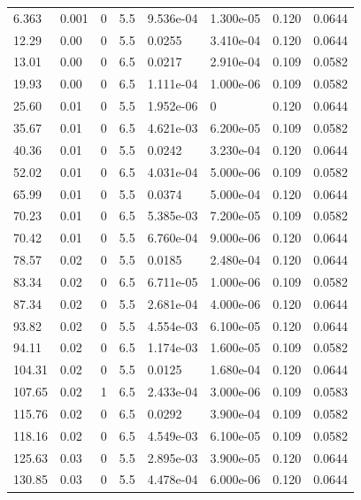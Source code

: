 \documentclass[preview]{standalone}
\begin{document}
{{\begin{tabular}{L{1.2cm}C{1.2cm} C{0.3cm}C{0.5cm} C{1.4cm}C{1.4cm} C{1.4cm}C{1.4cm}}
  6.363  &  0.001  & 0     & 5.5 &  9.536e-04  & 1.300e-05  & 0.120 &  0.0644   \\ 
  12.29  &  0.00  & 0     & 5.5 &  0.0255  & 3.410e-04  & 0.120 &  0.0644   \\ 
  13.01  &  0.00  & 0     & 6.5 &  0.0217  & 2.910e-04  & 0.109 &  0.0582   \\ 
  19.93  &  0.00  & 0     & 6.5 &  1.111e-04  & 1.000e-06  & 0.109 &  0.0582   \\ 
  25.60  &  0.01  & 0     & 5.5 &  1.952e-06  & 0  & 0.120 &  0.0644   \\ 
  35.67  &  0.01  & 0     & 6.5 &  4.621e-03  & 6.200e-05  & 0.109 &  0.0582   \\ 
  40.36  &  0.01  & 0     & 5.5 &  0.0242  & 3.230e-04  & 0.120 &  0.0644   \\ 
  52.02  &  0.01  & 0     & 6.5 &  4.031e-04  & 5.000e-06  & 0.109 &  0.0582   \\ 
  65.99  &  0.01  & 0     & 5.5 &  0.0374  & 5.000e-04  & 0.120 &  0.0644   \\ 
  70.23  &  0.01  & 0     & 6.5 &  5.385e-03  & 7.200e-05  & 0.109 &  0.0582   \\ 
  70.42  &  0.01  & 0     & 5.5 &  6.760e-04  & 9.000e-06  & 0.120 &  0.0644   \\ 
  78.57  &  0.02  & 0     & 5.5 &  0.0185  & 2.480e-04  & 0.120 &  0.0644   \\ 
  83.34  &  0.02  & 0     & 6.5 &  6.711e-05  & 1.000e-06  & 0.109 &  0.0582   \\ 
  87.34  &  0.02  & 0     & 5.5 &  2.681e-04  & 4.000e-06  & 0.120 &  0.0644   \\ 
  93.82  &  0.02  & 0     & 5.5 &  4.554e-03  & 6.100e-05  & 0.120 &  0.0644   \\ 
  94.11  &  0.02  & 0     & 6.5 &  1.174e-03  & 1.600e-05  & 0.109 &  0.0582   \\ 
  104.31  &  0.02  & 0     & 5.5 &  0.0125  & 1.680e-04  & 0.120 &  0.0644   \\ 
  107.65  &  0.02  & 1     & 6.5 &  2.433e-04  & 3.000e-06  & 0.109 &  0.0583   \\ 
  115.76  &  0.02  & 0     & 6.5 &  0.0292  & 3.900e-04  & 0.109 &  0.0582   \\ 
  118.16  &  0.02  & 0     & 6.5 &  4.549e-03  & 6.100e-05  & 0.109 &  0.0582   \\ 
  125.63  &  0.03  & 0     & 5.5 &  2.895e-03  & 3.900e-05  & 0.120 &  0.0644   \\ 
  130.85  &  0.03  & 0     & 5.5 &  4.478e-04  & 6.000e-06  & 0.120 &  0.0644   \\ 

\end{tabular}}}
\end{document}
